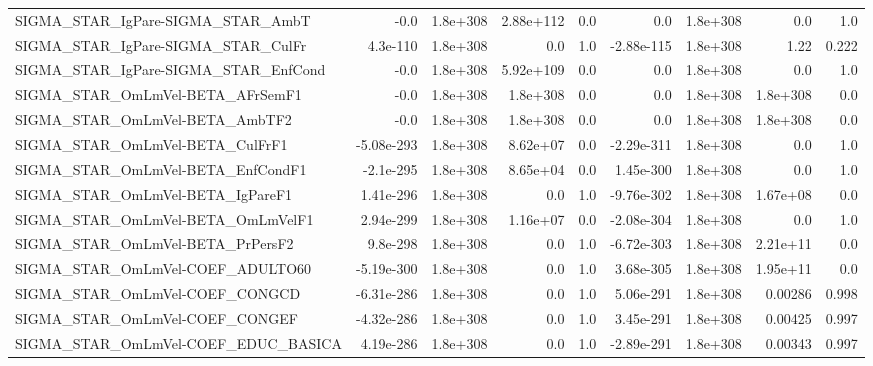 \begin{tabular}{lrrrrrrrr}
SIGMA\_STAR\_IgPare-SIGMA\_STAR\_AmbT     &        -0.0 &     1.8e+308 &  2.88e+112 &      0.0 &        0.0 &    1.8e+308 &          0.0 &           1.0 \\
SIGMA\_STAR\_IgPare-SIGMA\_STAR\_CulFr    &    4.3e-110 &     1.8e+308 &        0.0 &      1.0 & -2.88e-115 &    1.8e+308 &         1.22 &         0.222 \\
SIGMA\_STAR\_IgPare-SIGMA\_STAR\_EnfCond  &        -0.0 &     1.8e+308 &  5.92e+109 &      0.0 &        0.0 &    1.8e+308 &          0.0 &           1.0 \\
SIGMA\_STAR\_OmLmVel-BETA\_AFrSemF1      &        -0.0 &     1.8e+308 &   1.8e+308 &      0.0 &        0.0 &    1.8e+308 &     1.8e+308 &           0.0 \\
SIGMA\_STAR\_OmLmVel-BETA\_AmbTF2        &        -0.0 &     1.8e+308 &   1.8e+308 &      0.0 &        0.0 &    1.8e+308 &     1.8e+308 &           0.0 \\
SIGMA\_STAR\_OmLmVel-BETA\_CulFrF1       &  -5.08e-293 &     1.8e+308 &   8.62e+07 &      0.0 & -2.29e-311 &    1.8e+308 &          0.0 &           1.0 \\
SIGMA\_STAR\_OmLmVel-BETA\_EnfCondF1     &   -2.1e-295 &     1.8e+308 &   8.65e+04 &      0.0 &  1.45e-300 &    1.8e+308 &          0.0 &           1.0 \\
SIGMA\_STAR\_OmLmVel-BETA\_IgPareF1      &   1.41e-296 &     1.8e+308 &        0.0 &      1.0 & -9.76e-302 &    1.8e+308 &     1.67e+08 &           0.0 \\
SIGMA\_STAR\_OmLmVel-BETA\_OmLmVelF1     &   2.94e-299 &     1.8e+308 &   1.16e+07 &      0.0 & -2.08e-304 &    1.8e+308 &          0.0 &           1.0 \\
SIGMA\_STAR\_OmLmVel-BETA\_PrPersF2      &    9.8e-298 &     1.8e+308 &        0.0 &      1.0 & -6.72e-303 &    1.8e+308 &     2.21e+11 &           0.0 \\
SIGMA\_STAR\_OmLmVel-COEF\_ADULTO60      &  -5.19e-300 &     1.8e+308 &        0.0 &      1.0 &  3.68e-305 &    1.8e+308 &     1.95e+11 &           0.0 \\
SIGMA\_STAR\_OmLmVel-COEF\_CONGCD        &  -6.31e-286 &     1.8e+308 &        0.0 &      1.0 &  5.06e-291 &    1.8e+308 &      0.00286 &         0.998 \\
SIGMA\_STAR\_OmLmVel-COEF\_CONGEF        &  -4.32e-286 &     1.8e+308 &        0.0 &      1.0 &  3.45e-291 &    1.8e+308 &      0.00425 &         0.997 \\
SIGMA\_STAR\_OmLmVel-COEF\_EDUC\_BASICA   &   4.19e-286 &     1.8e+308 &        0.0 &      1.0 & -2.89e-291 &    1.8e+308 &      0.00343 &         0.997 \\

\end{tabular}

